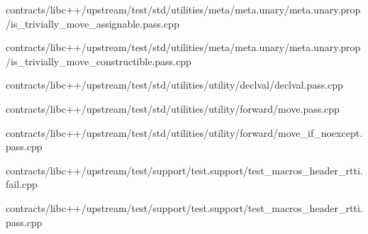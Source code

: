 \begin{DoxyCompactItemize}
contracts/libc++/upstream/test/std/utilities/meta/meta.\+unary/meta.\+unary.\+prop/is\+\_\+trivially\+\_\+move\+\_\+assignable.\+pass.\+cpp\item 
contracts/libc++/upstream/test/std/utilities/meta/meta.\+unary/meta.\+unary.\+prop/is\+\_\+trivially\+\_\+move\+\_\+constructible.\+pass.\+cpp\item 
contracts/libc++/upstream/test/std/utilities/utility/declval/declval.\+pass.\+cpp\item 
contracts/libc++/upstream/test/std/utilities/utility/forward/move.\+pass.\+cpp\item 
contracts/libc++/upstream/test/std/utilities/utility/forward/move\+\_\+if\+\_\+noexcept.\+pass.\+cpp\item 
contracts/libc++/upstream/test/support/test.\+support/test\+\_\+macros\+\_\+header\+\_\+rtti.\+fail.\+cpp\item 
contracts/libc++/upstream/test/support/test.\+support/test\+\_\+macros\+\_\+header\+\_\+rtti.\+pass.\+cpp\end{DoxyCompactItemize}
